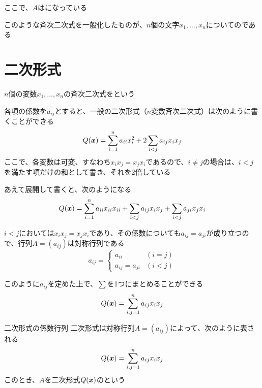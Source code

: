 \documentclass[../../../topic_linear-algebra]{subfiles}
\begin{document}
ここで、$A$はになっている

\br

このような斉次二次式を一般化したものが、$n$個の文字$x_1, \ldots, x_n$についてのである

\sectionline
\section{二次形式}

$n$個の変数$x_1, \ldots, x_n$の斉次二次式をという

\br

各項の係数を$a_{ij}$とすると、一般の二次形式（$n$変数斉次二次式）は次のように書くことができる
\begin{equation*}
  Q(\vb*{x}) = \sum_{i=1}^n a_{ii}x_i^2 + 2 \sum_{i < j} a_{ij}x_ix_j
\end{equation*}
ここで、各変数は可変、すなわち$x_ix_j = x_jx_i$であるので、$i\neq j$の場合は、$i <j$を満たす項だけの和として書き、それを2倍している

\br

あえて展開して書くと、次のようになる
\begin{equation*}
  Q(\vb*{x}) = \sum_{i=1}^n a_{ii}x_{ii}x_{ii} + \sum_{i<j} a_{ij}x_ix_j + \sum_{i<j} a_{ji}x_jx_i
\end{equation*}

\br

$i<j$においては$x_ix_j = x_jx_i$であり、その係数についても$a_{ij} = a_{ji}$が成り立つので、行列$A = (a_{ij})$は対称行列である
\begin{equation*}
  a_{ij} = \begin{cases}
    a_{ii}          & (i = j) \\
    a_{ij} = a_{ji} & (i < j)
  \end{cases}
\end{equation*}

\br

このように$a_{ij}$を定めた上で、$\sum$を1つにまとめることができる
\begin{equation*}
  Q(\vb*{x}) = \sum_{i, j=1}^n a_{ij}x_ix_j
\end{equation*}

\begin{definition*}{二次形式の係数行列}
  二次形式は対称行列$A = (a_{ij})$によって、次のように表される
  \begin{equation*}
    Q(\vb*{x}) = \sum_{i, j=1}^n a_{ij}x_ix_j
  \end{equation*}
  このとき、$A$を二次形式$Q(\vb*{x})$のという
\end{definition*}
\end{document}
